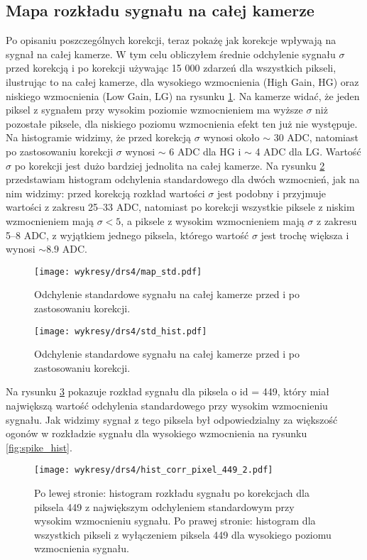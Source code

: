 \documentclass[a4paper,11pt,twoside]{article}
\begin{document}
\subsection{Mapa rozkładu sygnału na całej kamerze}
Po opisaniu poszczególnych korekcji, teraz pokażę jak korekcje wpływają na sygnał na całej kamerze. W tym celu obliczyłem średnie odchylenie sygnału $\sigma$ przed korekcją i po korekcji używając 15 000 zdarzeń dla wszystkich pikseli, ilustrując to na całej kamerze, dla  wysokiego wzmocnienia (High Gain, HG) oraz niskiego wzmocnienia (Low Gain, LG) na rysunku \ref{fig:map_cam_corr}. Na kamerze widać, że jeden piksel z sygnałem przy wysokim poziomie wzmocnieniem ma wyższe $\sigma$ niż pozostałe piksele, dla niskiego poziomu wzmocnienia efekt ten już nie występuje. Na histogramie widzimy, że przed korekcją $\sigma$ wynosi około $\sim$ 30 ADC, natomiast po zastosowaniu korekcji $\sigma$ wynosi $\sim$ 6 ADC dla HG i $\sim$ 4 ADC dla LG. Wartość $\sigma$ po korekcji jest dużo bardziej jednolita na całej kamerze. Na rysunku \ref{fig:hist_corr_map} przedstawiam histogram odchylenia standardowego dla dwóch wzmocnień, jak na nim widzimy: przed korekcją rozkład wartości $\sigma$ jest podobny i przyjmuje wartości z zakresu 25--33 ADC, natomiast po korekcji wszystkie piksele z niskim wzmocnieniem mają $\sigma < 5$, a piksele z wysokim wzmocnieniem mają $\sigma$ z zakresu 5--8 ADC, z wyjątkiem jednego piksela, którego wartość $\sigma$ jest trochę większa i wynosi $\sim 8.9$ ADC.
\begin{figure}[H] 
\centering
\texttt{[image: wykresy/drs4/map\_std.pdf]}
\caption{Odchylenie standardowe sygnału na całej kamerze przed i po zastosowaniu korekcji.}
\label{fig:map_cam_corr}
\end{figure}
\begin{figure}[H] 
\centering
\texttt{[image: wykresy/drs4/std\_hist.pdf]}
\caption{Odchylenie standardowe sygnału na całej kamerze przed i po zastosowaniu korekcji.}
\label{fig:hist_corr_map}
\end{figure}
Na rysunku \ref{fig:hist_corr_bad_pixel} pokazuje rozkład sygnału dla piksela o id = 449, który miał największą wartość odchylenia standardowego przy wysokim wzmocnieniu sygnału. Jak widzimy sygnał z tego piksela był odpowiedzialny za większość ogonów w rozkładzie sygnału dla wysokiego wzmocnienia na rysunku \ref{fig:spike_hist}.
\begin{figure}[H] 
\centering
\texttt{[image: wykresy/drs4/hist\_corr\_pixel\_449\_2.pdf]}
\caption{Po lewej stronie: histogram rozkładu sygnału po korekcjach dla piksela 449 z największym odchyleniem standardowym przy wysokim wzmocnieniu sygnału. Po prawej stronie: histogram dla wszystkich pikseli z wyłączeniem piksela 449 dla wysokiego poziomu wzmocnienia sygnału.}
\label{fig:hist_corr_bad_pixel}
\end{figure}
\end{document}
